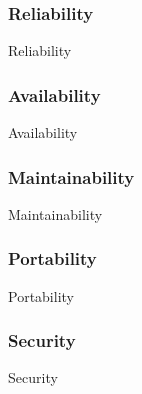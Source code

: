 \subsubsection{Reliability}
{Reliability}

\subsubsection{Availability}
{Availability}


\subsubsection{Maintainability}
{Maintainability}

\subsubsection{Portability}
{Portability}

\subsubsection{Security}
{Security}